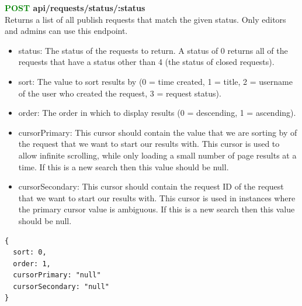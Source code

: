 \documentclass[onecolumn, draftclsnofoot,10pt, compsoc, usenames, dvipsnames]{IEEEtran}
\begin{document}
\noindent
\textbf{\textcolor{Green}{POST} api/requests/status/:status} \\
Returns a list of all publish requests that match the given status. Only editors and admins can use this endpoint.
\begin{itemize}
    \item status: The status of the requests to return. A status of 0 returns all of the requests that have a status other than 4 (the status of closed requests).
    \item sort: The value to sort results by (0 = time created, 1 = title, 2 = username of the user who created the request, 3 = request status).
    \item order: The order in which to display results (0 = descending, 1 = ascending).
    \item cursorPrimary: This cursor should contain the value that we are sorting by of the request that we want to start our results with. This cursor is used to allow infinite scrolling, while only loading a small number of page results at a time. If this is a new search then this value should be null.
    \item cursorSecondary: This cursor should contain the request ID of the request that we want to start our results with. This cursor is used in instances where the primary cursor value is ambiguous. If this is a new search then this value should be null.
\end{itemize}
\begin{lstlisting}[caption=Example Request Body]
{ 
  sort: 0,
  order: 1,
  cursorPrimary: "null"
  cursorSecondary: "null"
}
\end{lstlisting}
\end{document}
